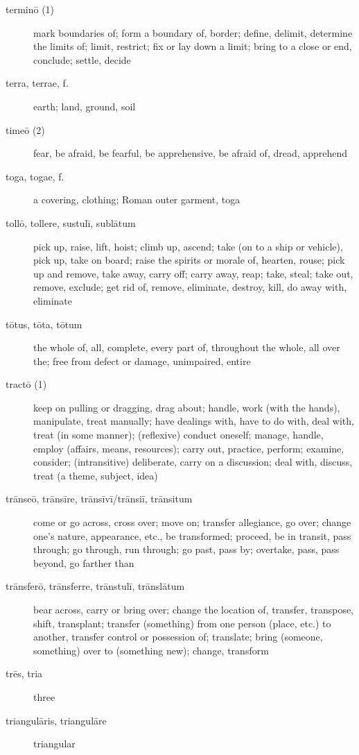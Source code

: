 \begin{description}
    \item[terminō (1)] mark boundaries of; form a boundary of, border; define, delimit, determine the limits of; limit, restrict; fix or lay down a limit; bring to a close or end, conclude; settle, decide
    \item[terra, terrae, f.] \marginnote{*}earth; land, ground, soil
    \item[timeō (2)] \marginnote{*}fear, be afraid, be fearful, be apprehensive, be afraid of, dread, apprehend
    \item[toga, togae, f.] a covering, clothing; Roman outer garment, toga
    \item[tollō, tollere, sustulī, sublātum] \marginnote{*}pick up, raise, lift, hoist; climb up, ascend; take (on to a ship or vehicle), pick up, take on board; raise the spirits or morale of, hearten, rouse; pick up and remove, take away, carry off; carry away, reap; take, steal; take out, remove, exclude; get rid of, remove, eliminate, destroy, kill, do away with, eliminate
    \item[tōtus, tōta, tōtum] \marginnote{*}the whole of, all, complete, every part of, throughout the whole, all over the; free from defect or damage, unimpaired, entire
    \item[tractō (1)] keep on pulling or dragging, drag about; handle, work (with the hands), manipulate, treat manually; have dealings with, have to do with, deal with, treat (in some manner); (reflexive) conduct oneself; manage, handle, employ (affairs, means, resources); carry out, practice, perform; examine, consider; (intransitive) deliberate, carry on a discussion; deal with, discuss, treat (a theme, subject, idea)
    \item[trānseō, trānsīre, trānsīvī/trānsiī, trānsitum] \marginnote{*}come or go across, cross over; move on; transfer allegiance, go over; change one's nature, appearance, etc., be transformed; proceed, be in transit, pass through; go through, run through; go past, pass by; overtake, pass, pass beyond, go farther than
    \item[trānsferō, trānsferre, trānstulī, trānslātum] bear across, carry or bring over; change the location of, transfer, transpose, shift, transplant; transfer (something) from one person (place, etc.) to another, transfer control or possession of; translate; bring (someone, something) over to (something new); change, transform
    \item[trēs, tria] \marginnote{*}three
    \item[triangulāris, triangulāre] triangular

\end{description}
